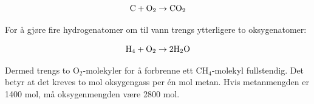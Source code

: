 $$\hbox{C} + \hbox{O}_2 \to \hbox{CO}_2$$

For å gjøre fire hydrogenatomer om til vann trengs ytterligere to oksygenatomer:

$$\hbox{H}_4 + \hbox{O}_2 \to 2\hbox{H}_2\hbox{O}$$

Dermed trengs to O$_{2}$-molekyler for å forbrenne ett CH$_{4}$-molekyl fullstendig. Det betyr at det kreves to mol oksygengass per én mol metan. Hvis metanmengden er 1400 mol, må oksygenmengden være 2800 mol.










